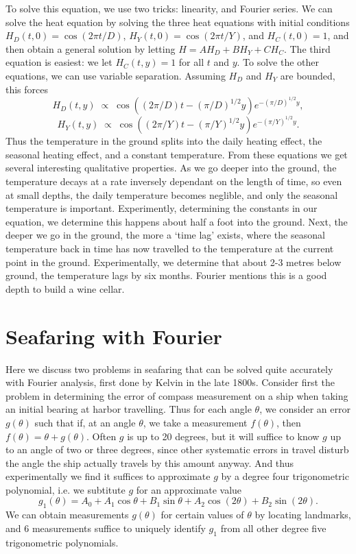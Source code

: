 To solve this equation, we use two tricks: linearity, and Fourier series. We can solve the heat equation by solving the three heat equations with initial conditions $H_D(t,0) = \cos(2\pi t/D)$, $H_Y(t,0) = \cos(2 \pi t/Y)$, and $H_C(t,0) = 1$, and then obtain a general solution by letting $H = A H_D + B H_Y + C H_C$. The third equation is easiest: we let $H_C(t,y) = 1$ for all $t$ and $y$. To solve the other equations, we can use variable separation. Assuming $H_D$ and $H_Y$ are bounded, this forces
%
\[ H_D(t,y)\; \propto\; \cos((2 \pi /D) t - (\pi / D)^{1/2} y) e^{- (\pi / D)^{1/2} y}, \]
\[ H_Y(t,y)\; \propto\; \cos((2\pi/Y)t - (\pi/Y)^{1/2} y) e^{- (\pi/Y)^{1/2} y}. \]
%
Thus the temperature in the ground splits into the daily heating effect, the seasonal heating effect, and a constant temperature. From these equations we get several interesting qualitative properties. As we go deeper into the ground, the temperature decays at a rate inversely dependant on the length of time, so even at small depths, the daily temperature becomes neglible, and only the seasonal temperature is important. Experimently, determining the constants in our equation, we determine this happens about half a foot into the ground. Next, the deeper we go in the ground, the more a `time lag' exists, where the seasonal temperature back in time has now travelled to the temperature at the current point in the ground. Experimentally, we determine that about 2-3 metres below ground, the temperature lags by six months. Fourier mentions this is a good depth to build a wine cellar.

\section{Seafaring with Fourier}

Here we discuss two problems in seafaring that can be solved quite accurately with Fourier analysis, first done by Kelvin in the late 1800s. Consider first the problem in determining the error of compass measurement on a ship when taking an initial bearing at harbor travelling. Thus for each angle $\theta$, we consider an error $g(\theta)$ such that if, at an angle $\theta$, we take a measurement $f(\theta)$, then $f(\theta) = \theta + g(\theta)$. Often $g$ is up to 20 degrees, but it will suffice to know $g$ up to an angle of two or three degrees, since other systematic errors in travel disturb the angle the ship actually travels by this amount anyway. And thus experimentally we find it suffices to approximate $g$ by a degree four trigonometric polynomial, i.e. we subtitute $g$ for an approximate value
%
\[ g_1(\theta) = A_0 + A_1 \cos \theta + B_1 \sin \theta + A_2 \cos(2\theta) + B_2 \sin(2\theta). \]
%
We can obtain measurements $g(\theta)$ for certain values of $\theta$ by locating landmarks, and 6 measurements suffice to uniquely identify $g_1$ from all other degree five trigonometric polynomials.

